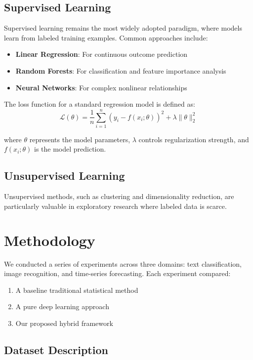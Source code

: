 \documentclass[12pt]{article}
\begin{document}
\subsection{Supervised Learning}

Supervised learning remains the most widely adopted paradigm, where models learn from labeled training examples. Common approaches include:
\begin{itemize}
  \item \textbf{Linear Regression}: For continuous outcome prediction
  \item \textbf{Random Forests}: For classification and feature importance analysis
  \item \textbf{Neural Networks}: For complex nonlinear relationships
\end{itemize}

The loss function for a standard regression model is defined as:
\begin{equation}
  \mathcal{L}(\theta) = \frac{1}{n} \sum_{i=1}^{n} (y_i - f(x_i; \theta))^2 + \lambda \|\theta\|_2^2
  \label{eq:loss}
\end{equation}

where $\theta$ represents the model parameters, $\lambda$ controls regularization strength, and $f(x_i; \theta)$ is the model prediction.

\subsection{Unsupervised Learning}

Unsupervised methods, such as clustering and dimensionality reduction, are particularly valuable in exploratory research where labeled data is scarce.

\section{Methodology}

We conducted a series of experiments across three domains: text classification, image recognition, and time-series forecasting. Each experiment compared:
\begin{enumerate}
  \item A baseline traditional statistical method
  \item A pure deep learning approach
  \item Our proposed hybrid framework
\end{enumerate}

\subsection{Dataset Description}
\end{document}
